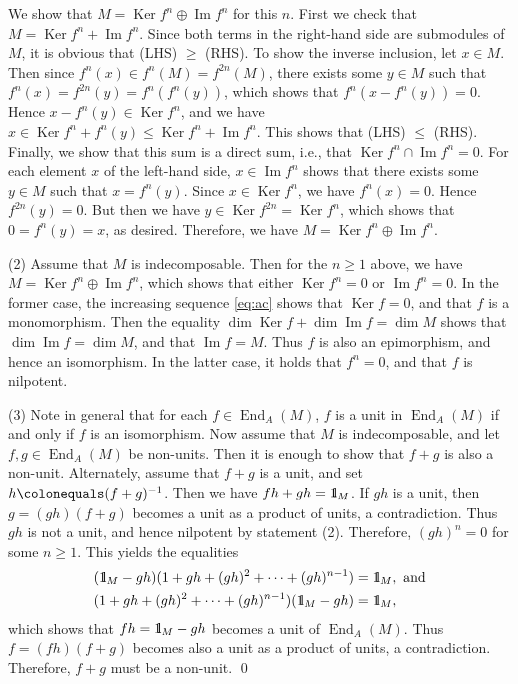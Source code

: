 \documentclass{surv-l}
\numberwithin{equation}{chapter}
\numberwithin{figure}{chapter}
\theoremstyle{plain}
\theoremstyle{definition}
\theoremstyle{remark}
\newcommand{\id}{1\kern-.25em{\text{{\rm l}}}}
\DeclareMathOperator{\Ker}{Ker}
\DeclareMathOperator{\End}{End}
\begin{document}
We show that $M = \Ker f^n \oplus \operatorname{Im} f^n$ for this $n$.
First we check that $M = \Ker f^n + \operatorname{Im} f^n$.
Since both terms in the right-hand side are submodules of $M$,
it is obvious that (LHS) $\ge$ (RHS).
To show the inverse inclusion, let $x \in M$.
Then since $f^n(x) \in f^n(M) = f^{2n}(M)$, there exists some $y \in M$
such that $f^n(x) = f^{2n}(y) = f^n(f^n(y))$, which shows that
$f^n(x - f^n(y)) = 0$.
Hence $x - f^n(y) \in \Ker f^n$, and we have $x \in \Ker f^n + f^n(y) \le \Ker f^n + \operatorname{Im} f^n$.
This shows that (LHS) $\le$ (RHS).
Finally, we show that this sum is a direct sum, i.e.,
that $\Ker f^n \cap \operatorname{Im} f^n = 0$.
For each element $x$ of the left-hand side, $x \in \operatorname{Im} f^n$ shows that
there exists some $y \in M$ such that $x = f^n(y)$.
Since $x \in \Ker f^n$, we have $f^n(x) = 0$.
Hence $f^{2n}(y) = 0$.
But then we have $y \in \Ker f^{2n} = \Ker f^{n}$, which shows that
$0 = f^n(y) = x$, as desired.
Therefore, we have $M = \Ker f^n \oplus \operatorname{Im} f^n$.

(2) Assume that $M$ is indecomposable.
Then for the $n \ge 1$ above, we have
$M = \Ker f^n \oplus \operatorname{Im} f^n$, which shows
that either $\Ker f^n = 0$ or $\operatorname{Im} f^n = 0$.
In the former case, the increasing sequence \eqref{eq:ac} shows that $\Ker f = 0$,
and that $f$ is a monomorphism.
Then the equality $\dim \Ker f + \dim \operatorname{Im} f = \dim M$ shows that
$\dim \operatorname{Im} f = \dim M$, and that $\operatorname{Im} f = M$.
Thus $f$ is also an epimorphism, and hence an isomorphism.
In the latter case, it holds that $f^n = 0$, and that $f$ is nilpotent.

(3) Note in general that for each $f \in \End_A(M)$,
$f$ is a unit in $\End_A(M)$ if and only if $f$ is an isomorphism.
Now assume that $M$ is indecomposable, and let $f, g \in \End_A(M)$ be non-units.
Then it is enough to show that $f+g$ is also a non-unit.
Alternately, assume that $f+g$ is a unit, and set $h\colonequals  (f+g)^{-1}$.
Then we have $fh+gh = \id_M$.
If $gh$ is a unit, then $g = (gh)(f+g)$ becomes a unit as a product of units, a contradiction.
Thus $gh$ is not a unit, and hence nilpotent by statement (2).
Therefore, $(gh)^n = 0$ for some $n \ge 1$.
This yields the equalities
\[
\begin{aligned}
(\id_M - gh)(1 + gh + (gh)^2 + \cdots + (gh)^{n-1}) &= \id_M, \text{ and}\\
(1 + gh + (gh)^2 + \cdots + (gh)^{n-1})(\id_M - gh) &= \id_M,
\end{aligned}
\]
which shows that $fh = \id_M - gh$ becomes a unit of $\End_A(M)$.
Thus $f = (fh)(f+g)$ becomes also a unit as a product of units, a contradiction.
Therefore, $f+g$ must be a non-unit. \qed
\end{document}
